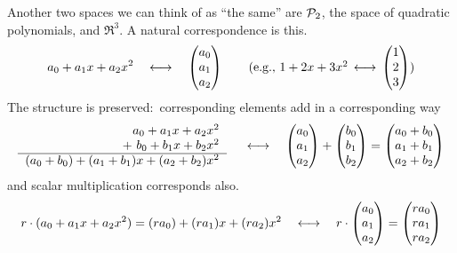 \begin{example} \label{exam:PolyTwoIsoRThree}  
Another two spaces we can think of as ``the same'' are       
\( \mathcal{P}_2 \), the space of quadratic polynomials,  and \( \Re^3 \). 
A natural correspondence is this.
\begin{equation*}
  a_0+a_1x+a_2x^2
  \quad\longleftrightarrow\quad
  \colvec{a_0 \\ a_1 \\ a_2}
  \tag*{\mbox{(e.g., $1+2x+3x^2\,\longleftrightarrow\,\colvec{1 \\ 2 \\ 3}$)}}
\end{equation*}
The structure is preserved:~corresponding elements add in a corresponding way
\begin{equation*}
    \mbox{\begin{tabular}{r}
        \( a_0+a_1x+a_2x^2 \)  \\
     +\,\,\( b_0+b_1x+b_2x^2 \)  \\ \hline
        \( (a_0+b_0)+(a_1+b_1)x+(a_2+b_2)x^2 \)
     \end{tabular} }
    \quad\longleftrightarrow\quad
    \colvec{a_0 \\ a_1 \\ a_2}
    +\colvec{b_0 \\ b_1 \\ b_2}
    =\colvec{a_0+b_0 \\ a_1+b_1 \\ a_2+b_2}
\end{equation*}
and scalar multiplication corresponds also.
\begin{equation*}
  r\cdot(a_0+a_1x+a_2x^2)=
    (ra_0)+(ra_1)x+(ra_2)x^2
  \quad\longleftrightarrow\quad
  r\cdot\begin{pmatrix} a_0 \\ a_1 \\ a_2 \end{pmatrix}
  =\begin{pmatrix} ra_0 \\ ra_1 \\ ra_2 \end{pmatrix}
\end{equation*}
\end{example}

